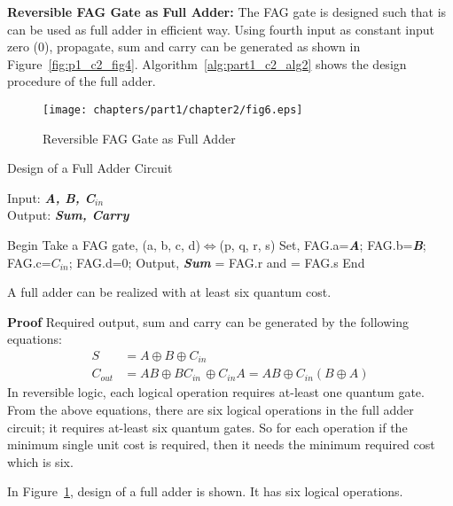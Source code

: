 \noindent\textbf{Reversible FAG Gate as Full Adder:} The FAG gate is designed such that is can be used as full adder in efficient way. Using fourth input as constant input zero (0), propagate, sum and carry can be generated as shown in Figure~\ref{fig:p1_c2_fig4}. Algorithm~\ref{alg:part1_c2_alg2} shows the design procedure of the full adder.
\begin{figure}[!tbh]
	\centering
	\texttt{[image: chapters/part1/chapter2/fig6.eps]}
	\caption{Reversible FAG Gate as Full Adder}
	\label{fig:p1_c2_fig6}
\end{figure}
\begin{algorithm}[H]
	\caption{Design of a Full Adder Circuit}
	Input: {\bf {\it A, B, C${}_{in}$}}\\
	Output: {\bf {\it Sum, Carry}}
	\label{alg:part1_c2_alg2}
	
	\begin{algorithmic}[1]
		
		\STATE Begin
		\STATE Take a FAG gate, (a, b, c, d)$\Leftrightarrow$(p, q, r, s)
		\STATE Set, FAG.a={\bf {\it A}}; FAG.b={\bf {\it B}}; \STATE FAG.c={\bf {\it $C_{in}$}}; FAG.d=0;
		\STATE Output, {\bf {\it Sum}} = FAG.r and 
		 = FAG.s{\bf }
		\STATE End
	\end{algorithmic}
\end{algorithm}
\begin{property}\textnormal{
	A full adder can be realized with at least six quantum cost.}
\end{property}

\noindent\textbf{Proof}  Required output, sum and carry can be generated by the following equations:
	\begin{align*}
	S &= A \oplus  B \oplus  C{}_{in}\\
	C{}_{out} &= AB \oplus  BC{}_{in\ }\oplus  C{}_{in}A = AB \oplus  C{}_{in}(B\oplus  A)
	\end{align*}\textnormal{
	In reversible logic, each logical operation requires at-least one quantum gate. From the above equations, there are six logical operations in the full adder circuit; it requires at-least six quantum gates. So for each operation if the minimum single unit cost is required, then it needs the minimum required cost which is six.}

\begin{example}\textnormal{
	In Figure~\ref{fig:p1_c2_fig6}, design of a full adder is shown. It has six logical operations.}%
\end{example}
